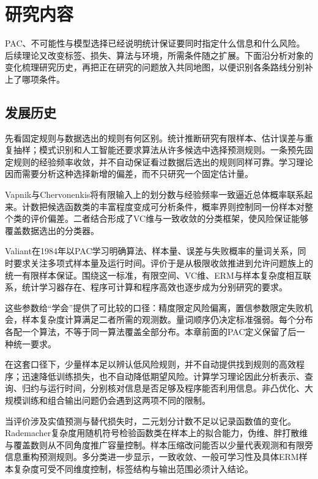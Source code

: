 \section{研究内容}
\label{sec:learning-theory-research-content}

PAC、不可能性与模型选择已经说明统计保证要同时指定什么信息和什么风险。后续理论又改变标签、损失、算法与环境，所需条件随之扩展。下面沿分析对象的变化梳理研究历史，再把正在研究的问题放入共同地图，以便识别各条路线分别补上了哪项条件。

\subsection{发展历史}

先看固定规则与数据选出的规则有何区别。统计推断研究有限样本、估计误差与重复抽样；模式识别和人工智能还要求算法从许多候选中选择预测规则。一条预先固定规则的经验频率收敛，并不自动保证看过数据后选出的规则同样可靠。学习理论因而需要分析这种选择新增的偏差，而不只研究一个固定估计量。

Vapnik与Chervonenkis将有限输入上的划分数与经验频率一致逼近总体概率联系起来。计数把候选函数类的丰富程度变成可分析条件，概率界则控制同一份样本对整个类的评价偏差。二者结合形成了VC维与一致收敛的分类框架，使风险保证能够覆盖数据选出的分类器。

Valiant在1984年以PAC学习明确算法、样本量、误差与失败概率的量词关系，同时要求关注多项式样本量及运行时间。评价于是从极限收敛推进到允许问题族上的统一有限样本保证。围绕这一标准，有限空间、VC维、ERM与样本复杂度相互联系，统计学习器存在、程序可计算和程序高效也逐步成为分别研究的要求。

这些参数给“学会”提供了可比较的口径：精度限定风险偏离，置信参数限定失败机会，样本复杂度计算满足二者所需的观测数。量词顺序仍决定标准强弱。每个分布各配一个算法，不等于同一算法覆盖全部分布。本章前面的PAC定义保留了后一种统一要求。

在这套口径下，少量样本足以辨认低风险规则，并不自动提供找到规则的高效程序；迅速降低训练损失，也不自动降低期望风险。计算学习理论因此分析表示、查询、归约与运行时间，分别核对信息是否足够及程序能否利用信息。非凸优化、大规模训练和组合输出问题仍会遇到这两项不同的限制。

当评价涉及实值预测与替代损失时，二元划分计数不足以记录函数值的变化。Rademacher复杂度用随机符号检验函数类在样本上的拟合能力，伪维、胖打散维与覆盖数则从不同角度推广容量控制。样本压缩改问能否以少量代表观测和有限旁信息重构预测规则。多分类进一步显示，一致收敛、一般可学习性及具体ERM样本复杂度可受不同维度控制，标签结构与输出范围必须计入结论。

